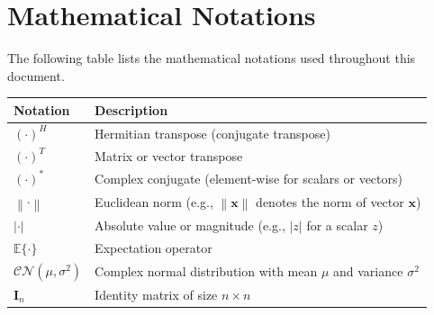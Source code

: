 \documentclass[10pt,a4paper]{article} %
\newcommand{\norm}[1]{\left\| #1 \right\|}
\newcommand{\abs}[1]{\left| #1 \right|}
\newcommand{\E}{\mathbb{E}} %
\newcommand{\CN}{\mathcal{CN}} %
\begin{document}
\section*{Mathematical Notations}
\singlespacing

The following table lists the mathematical notations used throughout this document.

\begin{table}[h]
\centering
\begin{tabular}{ll}
\toprule
\textbf{Notation} & \textbf{Description} \\
\midrule
$(\cdot)^H$ & Hermitian transpose (conjugate transpose) \\
$(\cdot)^T$ & Matrix or vector transpose \\
$(\cdot)^*$ & Complex conjugate (element-wise for scalars or vectors) \\
$\norm{\cdot}$ & Euclidean norm (e.g., $\norm{\mathbf{x}}$ denotes the norm of vector $\mathbf{x}$) \\
$\abs{\cdot}$ & Absolute value or magnitude (e.g., $\abs{z}$ for a scalar $z$) \\
$\E\{\cdot\}$ & Expectation operator \\
$\CN(\mu, \sigma^2)$ & Complex normal distribution with mean $\mu$ and variance $\sigma^2$ \\
$\mathbf{I}_n$ & Identity matrix of size $n \times n$ \\
\midrule
\end{tabular}
\label{tab:notations}
\end{table}
\end{document}
